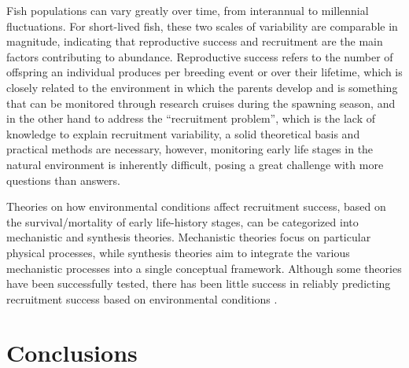 Fish populations can vary greatly over time, from interannual to millennial fluctuations. For short-lived fish, these two scales of variability are comparable in magnitude, indicating that reproductive success and recruitment are the main factors contributing to abundance. Reproductive success refers to the number of offspring an individual produces per breeding event or over their lifetime, which is closely related to the environment in which the parents develop and is something that can be monitored through research cruises during the spawning season, and in the other hand to address the ``recruitment problem'', which is the lack of knowledge to explain recruitment variability, a solid theoretical basis and practical methods are necessary, however, monitoring early life stages in the natural environment is inherently difficult, posing a great challenge with more questions than answers.

Theories on how environmental conditions affect recruitment success, based on the survival/mortality of early life-history stages, can be categorized into mechanistic and synthesis theories. Mechanistic theories focus on particular physical processes, while synthesis theories aim to integrate the various mechanistic processes into a single conceptual framework. Although some theories have been successfully tested, there has been little success in reliably predicting recruitment success based on environmental conditions \citep{ColeMcGl1998}.

\section{Conclusions}

\clearpage

%
%
%
%
%
%
%
%
%
